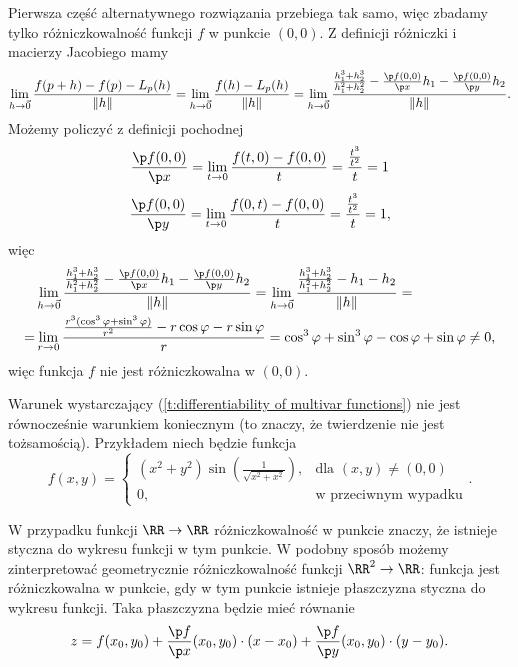 \begin{solution}
    Pierwsza część alternatywnego rozwiązania przebiega tak samo, więc zbadamy tylko różniczkowalność funkcji $f$ w punkcie $(0, 0)$. Z definicji różniczki i macierzy Jacobiego mamy
    \[ \lim_{h\to\vec{0}} \frac{f(p + h) - f(p) - L_{p}(h)}{\Vert h \Vert} = \lim_{h\to\vec{0}} \frac{f(h) - L_{p}(h)}{\Vert h \Vert} = \lim_{h\to\vec{0}} \frac{\frac{h_1^3 + h_2^3}{h_1^2 + h_2^2} - \frac{\p f(0, 0)}{\p x}h_1 - \frac{\p f(0, 0)}{\p y}h_2}{\Vert h \Vert}. \]
    Możemy policzyć z definicji pochodnej
    \[ \frac{\p f(0, 0)}{\p x} = \lim_{t\to 0}\frac{f(t, 0) - f(0, 0)}{t} = \frac{\frac{t^3}{t^2}}{t} = 1 \]
    \[ \frac{\p f(0, 0)}{\p y} = \lim_{t\to 0}\frac{f(0, t) - f(0, 0)}{t} = \frac{\frac{t^3}{t^2}}{t} = 1, \]
    więc
    \begin{align*}
        &\lim_{h\to\vec{0}} \frac{\frac{h_1^3 + h_2^3}{h_1^2 + h_2^2} - \frac{\p f(0, 0)}{\p x}h_1 - \frac{\p f(0, 0)}{\p y}h_2}{\Vert h \Vert} = \lim_{h\to\vec{0}} \frac{\frac{h_1^3 + h_2^3}{h_1^2 + h_2^2} - h_1 - h_2}{\Vert h \Vert} = \\
        =& \lim_{r\to 0}\frac{\frac{r^3(\cos^3\varphi + \sin^3\varphi)}{r^2} - r\cos\varphi - r\sin\varphi}{r} = \cos^3\varphi + \sin^3\varphi - \cos\varphi + \sin\varphi \neq 0,
    \end{align*}
    więc funkcja $f$ nie jest różniczkowalna w $(0, 0)$.
\end{solution}

\begin{remark}
    Warunek wystarczający (\ref{t:differentiability of multivar functions}) nie jest równocześnie warunkiem koniecznym (to znaczy, że twierdzenie nie jest tożsamością). Przykładem niech będzie funkcja
    \[ f(x, y) = \begin{cases}(x^2 + y^2)\sin\left(\frac{1}{\sqrt{x^2 + x^2}}\right), & \text{dla } (x, y) \neq (0, 0) \\ 0, & \text{w przeciwnym wypadku}\end{cases}. \]
\end{remark}

W przypadku funkcji $\RR \to \RR$ różniczkowalność w punkcie znaczy, że istnieje styczna do wykresu funkcji w tym punkcie. W podobny sposób możemy zinterpretować geometrycznie różniczkowalność funkcji $\RR^2 \to \RR$: funkcja jest różniczkowalna w punkcie, gdy w tym punkcie istnieje płaszczyzna styczna do wykresu funkcji. Taka płaszczyzna będzie mieć równanie
\begin{equation}
    z = f(x_0, y_0) + \frac{\p f}{\p x}(x_0, y_0) \cdot (x - x_0) + \frac{\p f}{\p y}(x_0, y_0) \cdot (y -y_0).
\end{equation}

